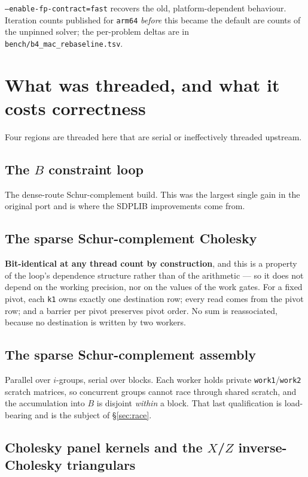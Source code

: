 \documentclass[11pt]{article}
\newcommand{\bMat}{B}
\newcommand{\code}[1]{\texttt{#1}}
\begin{document}
\code{--enable-fp-contract=fast} recovers the old, platform-dependent behaviour. Iteration counts
published for \code{arm64} \emph{before} this became the default are counts of the unpinned
solver; the per-problem deltas are in \code{bench/b4\_mac\_rebaseline.tsv}.

\section{What was threaded, and what it costs correctness}

Four regions are threaded here that are serial or ineffectively threaded upstream.

\subsection{The \texorpdfstring{$\bMat$}{bMat} constraint loop}

The dense-route Schur-complement build. This was the largest single gain in the original port and
is where the SDPLIB improvements come from.

\subsection{The sparse Schur-complement Cholesky}

\textbf{Bit-identical at any thread count by construction}, and this is a property of the loop's
dependence structure rather than of the arithmetic --- so it does not depend on the working
precision, nor on the values of the work gates. For a fixed pivot, each \code{k1} owns exactly one
destination row; every read comes from the pivot row; and a barrier per pivot preserves pivot
order. No sum is reassociated, because no destination is written by two workers.

\subsection{The sparse Schur-complement assembly}

Parallel over $i$-groups, serial over blocks. Each worker holds private \code{work1}/\code{work2}
scratch matrices, so concurrent groups cannot race through shared scratch, and the accumulation
into $\bMat$ is disjoint \emph{within} a block. That last qualification is load-bearing and is the
subject of \S\ref{sec:race}.

\subsection{Cholesky panel kernels and the \texorpdfstring{$X$/$Z$}{X/Z} inverse-Cholesky triangulars}
\end{document}
